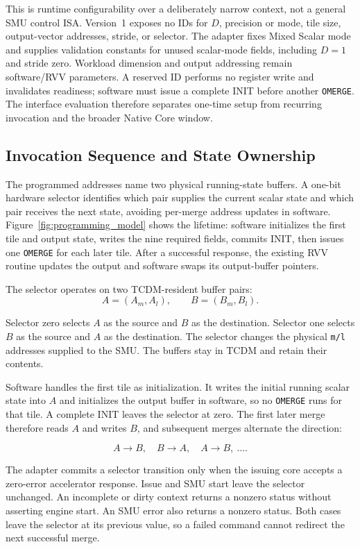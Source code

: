 \documentclass[journal]{IEEEtran}
\begin{document}
This is runtime configurability over a deliberately narrow context, not a
general SMU control ISA. Version~1 exposes no IDs for $D$, precision or mode,
tile size, output-vector addresses, stride, or selector. The adapter fixes
Mixed Scalar mode and supplies validation constants for unused scalar-mode
fields, including $D=1$ and stride zero. Workload dimension and output
addressing remain software/RVV parameters. A reserved ID performs no
register write and invalidates readiness; software must issue a complete INIT
before another \texttt{OMERGE}. The interface evaluation therefore separates
one-time setup from recurring invocation and the broader Native Core window.

\subsection{Invocation Sequence and State Ownership}
\label{sec:ownership}
The programmed addresses name two physical running-state buffers. A
one-bit hardware selector identifies which pair supplies the current scalar
state and which pair receives the next state, avoiding per-merge address
updates in software. Figure~\ref{fig:programming_model} shows the lifetime:
software initializes the first tile and output state, writes the nine
required fields, commits INIT, then issues one \texttt{OMERGE} for each later
tile. After a successful response, the existing RVV routine updates the
output and software swaps its output-buffer pointers.

The selector operates on two TCDM-resident buffer pairs:
\[
A=(A_m,A_l),
\qquad
B=(B_m,B_l).
\]

Selector zero selects $A$ as the source and $B$ as the destination. Selector
one selects $B$ as the source and $A$ as the destination. The selector changes
the physical \texttt{m/l} addresses supplied to the SMU. The buffers stay in
TCDM and retain their contents.

Software handles the first tile as initialization. It writes the initial
running scalar state into $A$ and initializes the output buffer in software,
so no \texttt{OMERGE} runs for that tile. A complete INIT
leaves the selector at zero. The first later merge therefore reads $A$ and
writes $B$, and subsequent merges alternate the direction:

\[
  A\rightarrow B,\quad
  B\rightarrow A,\quad
  A\rightarrow B,\ \ldots.
\]

The adapter commits a selector transition only when the issuing core accepts a
zero-error accelerator response. Issue and SMU start leave the selector
unchanged. An incomplete or dirty context returns a nonzero status without
asserting engine start. An SMU error also returns a nonzero status. Both cases
leave the selector at its previous value, so a failed command cannot redirect
the next successful merge.
\end{document}
